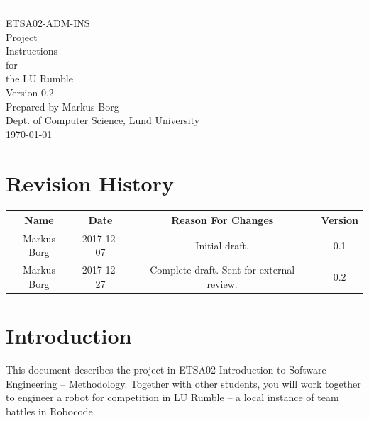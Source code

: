 \documentclass{scrreprt}
\date{}
\def\myversion{0.2 }
\begin{document}
\begin{flushright}
    \rule{16cm}{5pt}\vskip1cm
    \begin{bfseries}
    	\LARGE{ETSA02-ADM-INS}\\
    	\vspace{1.5cm}
        \Huge{Project\\ Instructions}\\
        \vspace{0.5cm}
        for\\
        \vspace{0.5cm}
        the LU Rumble\\
        \vspace{1.5cm}
        \LARGE{Version \myversion}\\ %
        \vspace{1.5cm}
        Prepared by Markus Borg\\
        Dept. of Computer Science, Lund University\\
        \vspace{1.5cm}
        \today\\
    \end{bfseries}
\end{flushright}

\tableofcontents


\chapter*{Revision History}

\begin{center}
    \begin{tabular}{|c|c|c|c|}
        \hline
	    Name & Date & Reason For Changes & Version\\
        \hline
	    Markus Borg & 2017-12-07 & Initial draft. & 0.1\\
        \hline
        Markus Borg & 2017-12-27 & Complete draft. Sent for external review. & 0.2\\
        \hline
    \end{tabular}
\end{center}

\chapter{Introduction}
This document describes the project in ETSA02 Introduction to Software Engineering -- Methodology. Together with other students, you will work together to engineer a robot for competition in LU Rumble -- a local instance of team battles in Robocode. 
\end{document}
